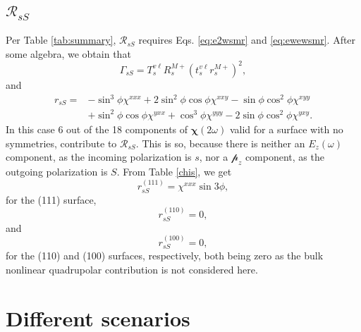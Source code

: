 \subsection{\texorpdfstring{$\mathcal{R}_{sS}$}{RsS}}\label{sec:RsS}

Per Table \ref{tab:summary}, $\mathcal{R}_{sS}$ requires Eqs. \eqref{eq:e2wsmr} and \eqref{eq:ewewsmr}. After some algebra, we obtain that
\begin{equation}
\Gamma_{sS} = 
T_{s}^{v\ell}R^{M+}_{s}\left(t^{v\ell}_{s}r^{M+}_{s}\right)^{2},
\end{equation}
and
\begin{equation}
\begin{split}
r_{sS} = 
&- \sin^{3}\phi\chi^{xxx}
 + 2\sin^{2}\phi\cos\phi\chi^{xxy}
 - \sin\phi\cos^{2}\phi\chi^{xyy}\\
&+ \sin^{2}\phi\cos\phi\chi^{yxx}
 + \cos^{3}\phi\chi^{yyy}
 - 2\sin\phi\cos^{2}\phi\chi^{yxy}
.
\end{split}
\end{equation}
In this case 6 out of the 18 components of $\boldsymbol{\chi}(2\omega)$ valid for a surface with no symmetries, contribute to $\mathcal{R}_{sS}$. This is so, because there is neither an $E_{z}(\omega)$ component, as the incoming polarization is $s$, nor a $\mathcal{p}_{z}$ component, as the outgoing polarization is $S$. From Table \ref{chis}, we get
\begin{equation}
r^{(111)}_{sS} = \chi^{xxx}\sin3\phi,
\end{equation}
for the (111) surface,
\begin{equation}
r^{(110)}_{sS} = 0,
\end{equation}
and
\begin{equation}
r^{(100)}_{sS} = 0,
\end{equation}
for the (110) and (100) surfaces, respectively, both being zero as the bulk nonlinear quadrupolar contribution is not considered here.



\section{Different scenarios}\label{sec:scenarios}


